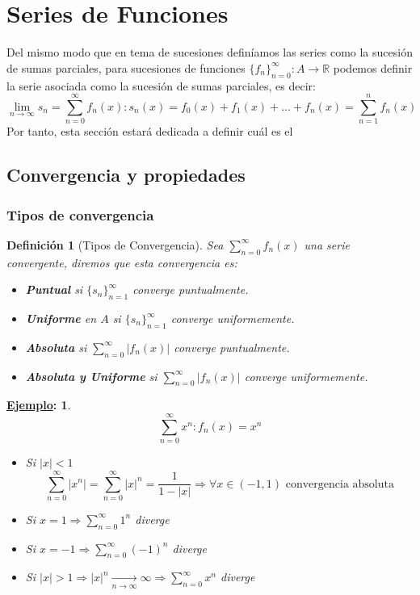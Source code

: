 \documentclass[10pt,a4paper,openright]{book}
\theoremstyle{break}
\newtheorem*{defi}{Definición}
\newtheorem*{ej}{\underline{Ejemplo}:}
\begin{document}
\section{Series de Funciones}
Del mismo modo que en tema de sucesiones definíamos las series como la sucesión de sumas parciales, para sucesiones de funciones $\{f_n\}_{n = 0}^\infty : A \rightarrow \mathbb{R}$ podemos definir la serie asociada como la sucesión de sumas parciales, es decir:
$$\lim_{n\rightarrow \infty} s_n  = \sum_{n=0}^{\infty} f_n (x) : s_n (x) = f_0 (x) + f_1 (x) + \ldots + f_n (x) = \sum_{n=1}^{n} f_n (x)$$
Por tanto, esta sección estará dedicada a definir cuál es el 

\subsection{Convergencia y propiedades}
\subsubsection{Tipos de convergencia}
\begin{defi}[Tipos de Convergencia]
Sea $\displaystyle \sum_{n=0}^{\infty} f_n (x)$ una serie convergente, diremos que esta convergencia es:
\begin{itemize}
\item \textbf{Puntual} si $\{s_n\}_{n = 1}^\infty$ converge puntualmente.
\item \textbf{Uniforme} en $A$ si $\{s_n\}_{n = 1}^\infty$ converge uniformemente.
\item \textbf{Absoluta} si $\sum_{n=0}^{\infty} |f_n (x)|$ converge puntualmente.
\item \textbf{Absoluta y Uniforme} si $\sum_{n=0}^{\infty} |f_n (x)|$ converge uniformemente.
\end{itemize}
\end{defi}

\begin{ej}
$$\sum_{n=0}^{\infty} x^n : f_n(x) = x^n$$
\begin{itemize}
\item Si $|x| < 1$
$$\sum_{n=0}^{\infty} |x^n| = \sum_{n=0}^{\infty} |x|^n = \frac{1}{1 - |x|} \Rightarrow \forall x \in (-1,1) \mbox{ convergencia absoluta}$$
\item Si $x = 1 \Rightarrow \sum_{n=0}^{\infty} 1^n $ diverge
\item Si $x = -1 \Rightarrow \sum_{n=0}^{\infty} (-1)^n $ diverge
\item Si $|x| > 1 \Rightarrow |x|^n \underset{n \to \infty}{\longrightarrow} \infty \Rightarrow \sum_{n=0}^{\infty} x^n$ diverge
\end{itemize}
\end{ej}
\end{document}

